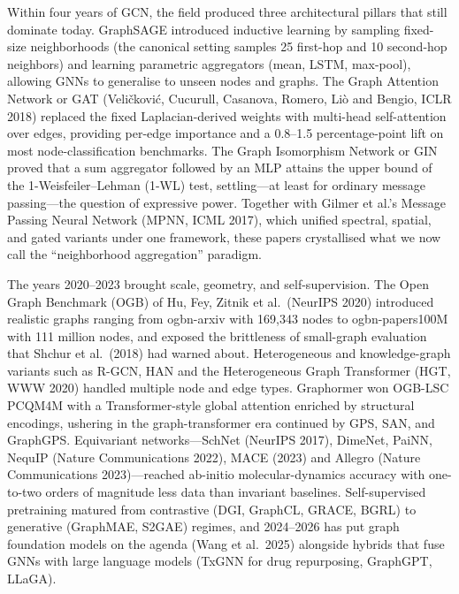 \documentclass{article}
\begin{document}
Within four years of GCN, the field produced three architectural pillars that still dominate today. GraphSAGE \citep{hamilton2017inductiverepresent} introduced inductive learning by sampling fixed-size neighborhoods (the canonical setting samples 25 first-hop and 10 second-hop neighbors) and learning parametric aggregators (mean, LSTM, max-pool), allowing GNNs to generalise to unseen nodes and graphs. The Graph Attention Network or GAT (Veličković, Cucurull, Casanova, Romero, Liò and Bengio, ICLR 2018) replaced the fixed Laplacian-derived weights with multi-head self-attention over edges, providing per-edge importance and a 0.8--1.5 percentage-point lift on most node-classification benchmarks. The Graph Isomorphism Network or GIN \citep{xu2019howpowerfularegrap} proved that a sum aggregator followed by an MLP attains the upper bound of the 1-Weisfeiler--Lehman (1-WL) test, settling---at least for ordinary message passing---the question of expressive power. Together with Gilmer et al.'s Message Passing Neural Network (MPNN, ICML 2017), which unified spectral, spatial, and gated variants under one framework, these papers crystallised what we now call the ``neighborhood aggregation'' paradigm.

The years 2020--2023 brought scale, geometry, and self-supervision. The Open Graph Benchmark (OGB) of Hu, Fey, Zitnik et al.~(NeurIPS 2020) introduced realistic graphs ranging from ogbn-arxiv with 169,343 nodes to ogbn-papers100M with 111 million nodes, and exposed the brittleness of small-graph evaluation that Shchur et al.~(2018) had warned about. Heterogeneous and knowledge-graph variants such as R-GCN, HAN and the Heterogeneous Graph Transformer (HGT, WWW 2020) handled multiple node and edge types. Graphormer \citep{ying2021dotransformersreal} won OGB-LSC PCQM4M with a Transformer-style global attention enriched by structural encodings, ushering in the graph-transformer era continued by GPS, SAN, and GraphGPS. Equivariant networks---SchNet (NeurIPS 2017), DimeNet, PaiNN, NequIP (Nature Communications 2022), MACE (2023) and Allegro (Nature Communications 2023)---reached ab-initio molecular-dynamics accuracy with one-to-two orders of magnitude less data than invariant baselines. Self-supervised pretraining matured from contrastive (DGI, GraphCL, GRACE, BGRL) to generative (GraphMAE, S2GAE) regimes, and 2024--2026 has put graph foundation models on the agenda (Wang et al.~2025) alongside hybrids that fuse GNNs with large language models (TxGNN for drug repurposing, GraphGPT, LLaGA).
\end{document}
